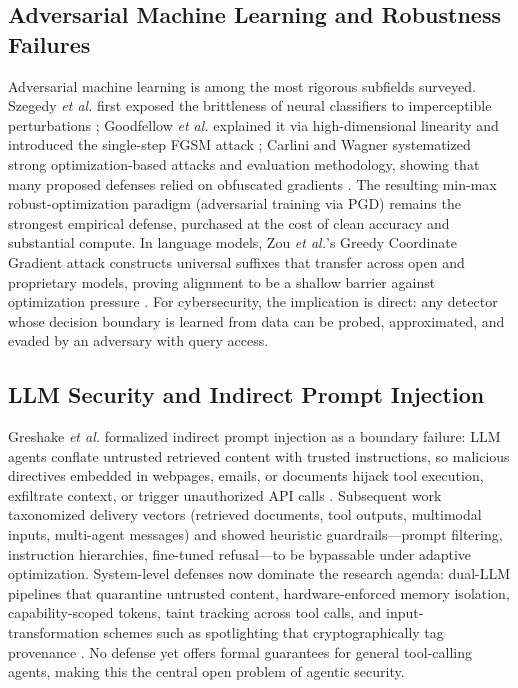 \documentclass[conference,10pt,twocolumn,a4paper]{IEEEtran}
\begin{document}
\subsection{Adversarial Machine Learning and Robustness Failures}
Adversarial machine learning is among the most rigorous subfields surveyed. Szegedy \emph{et al.} first exposed the brittleness of neural classifiers to imperceptible perturbations \cite{szegedy2014intriguing}; Goodfellow \emph{et al.} explained it via high-dimensional linearity and introduced the single-step FGSM attack \cite{goodfellow2015explaining}; Carlini and Wagner systematized strong optimization-based attacks and evaluation methodology, showing that many proposed defenses relied on obfuscated gradients \cite{carlini2017towards}. The resulting min-max robust-optimization paradigm (adversarial training via PGD) remains the strongest empirical defense, purchased at the cost of clean accuracy and substantial compute. In language models, Zou \emph{et al.}'s Greedy Coordinate Gradient attack constructs universal suffixes that transfer across open and proprietary models, proving alignment to be a shallow barrier against optimization pressure \cite{zou2023universal, szegedy2014intriguing}. For cybersecurity, the implication is direct: any detector whose decision boundary is learned from data can be probed, approximated, and evaded by an adversary with query access.

\subsection{LLM Security and Indirect Prompt Injection}
Greshake \emph{et al.} formalized indirect prompt injection as a boundary failure: LLM agents conflate untrusted retrieved content with trusted instructions, so malicious directives embedded in webpages, emails, or documents hijack tool execution, exfiltrate context, or trigger unauthorized API calls \cite{greshake2023indirect}. Subsequent work taxonomized delivery vectors (retrieved documents, tool outputs, multimodal inputs, multi-agent messages) and showed heuristic guardrails---prompt filtering, instruction hierarchies, fine-tuned refusal---to be bypassable under adaptive optimization. System-level defenses now dominate the research agenda: dual-LLM pipelines that quarantine untrusted content, hardware-enforced memory isolation, capability-scoped tokens, taint tracking across tool calls, and input-transformation schemes such as spotlighting that cryptographically tag provenance \cite{xiang2026post, hines2026securing}. No defense yet offers formal guarantees for general tool-calling agents, making this the central open problem of agentic security.
\end{document}

